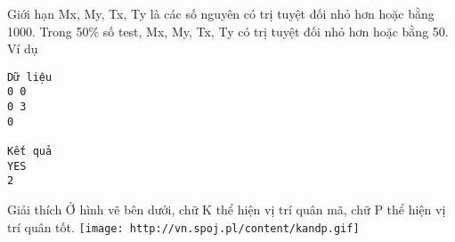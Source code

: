 Giới hạn  
Mx, My, Tx, Ty là các số nguyên có trị tuyệt đối nhỏ hơn hoặc bằng 1000. Trong 50\% số test, Mx, My, Tx, Ty có trị tuyệt đối nhỏ hơn hoặc bằng 50.
   Ví dụ  
\begin{verbatim}
Dữ liệu
0 0
0 3
0

Kết quả
YES
2
\end{verbatim}
   Giải thích  
Ở hình vẽ bên dưới, chữ K thể hiện vị trí quân mã, chữ P thể hiện vị trí quân tốt.  
\texttt{[image: http://vn.spoj.pl/content/kandp.gif]}